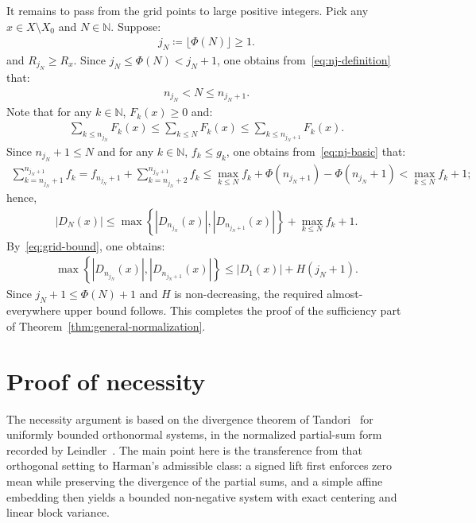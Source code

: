 \documentclass[12pt,reqno]{amsart}
\theoremstyle{definition}
\theoremstyle{plain}
\begin{document}
It remains to pass from the grid points to large positive integers. Pick any $x\in X\setminus X_0$ and $N\in\mathbb{N}$. Suppose:
\begin{align*}
    j_N
    \coloneqq
    \lfloor\Phi(N)\rfloor\geq 1.
\end{align*}
and $R_{j_N}\geq R_x$. Since $j_N\leq\Phi(N)<j_N+1$, one obtains from~\eqref{eq:nj-definition} that:
\begin{align*}
    n_{j_N}<N\leq n_{j_N+1}.
\end{align*}
Note that for any $k\in\mathbb{N}$, $F_k(x)\geq0$ and:
\begin{align*}
    \sum_{k\leq n_{j_N}}F_k(x)
    \leq
    \sum_{k\leq N}F_k(x)
    \leq
    \sum_{k\leq n_{j_N+1}}F_k(x).
\end{align*}
Since $n_{j_N}+1\leq N$ and for any $k\in\mathbb{N}$, $f_k\leq g_k$, one obtains from~\eqref{eq:nj-basic} that:
\begin{align*}
    \sum_{k=n_{j_N}+1}^{n_{j_N+1}}f_k
    =
    f_{n_{j_N}+1}
    +
    \sum_{k=n_{j_N}+2}^{n_{j_N+1}}f_k
    \leq
    \max_{k\leq N}f_k
    +
    \Phi{\left(n_{j_N+1}\right)}-\Phi{\left(n_{j_N}+1\right)}
    <
    \max_{k\leq N}f_k+1;
\end{align*}
hence, 
\begin{align*}
    \left|D_N(x)\right|
    \leq
    \max\left\{
        \left|D_{n_{j_N}}(x)\right|,
        \left|D_{n_{j_N+1}}(x)\right|
    \right\}
    +
    \max_{k\leq N}f_k+1.
\end{align*}
By~\eqref{eq:grid-bound}, one obtains:
\begin{align*}
    \max\left\{
        \left|D_{n_{j_N}}(x)\right|,
        \left|D_{n_{j_N+1}}(x)\right|
    \right\}
    \leq
    \left|D_1(x)\right|+H(j_N+1).
\end{align*}
Since $j_N+1\leq\Phi(N)+1$ and $H$ is non-decreasing, the required almost-everywhere upper bound follows. This completes the proof of the sufficiency part of Theorem~\ref{thm:general-normalization}.

\section{Proof of necessity}\label{sec:lower-proof}

The necessity argument is based on the divergence theorem of Tandori~\cite{Tandori1957I} for uniformly bounded orthonormal systems, in the normalized partial-sum form recorded by Leindler~\cite{Leindler1960}. The main point here is the transference from that orthogonal setting to Harman's admissible class: a signed lift first enforces zero mean while preserving the divergence of the partial sums, and a simple affine embedding then yields a bounded non-negative system with exact centering and linear block variance.
\end{document}
